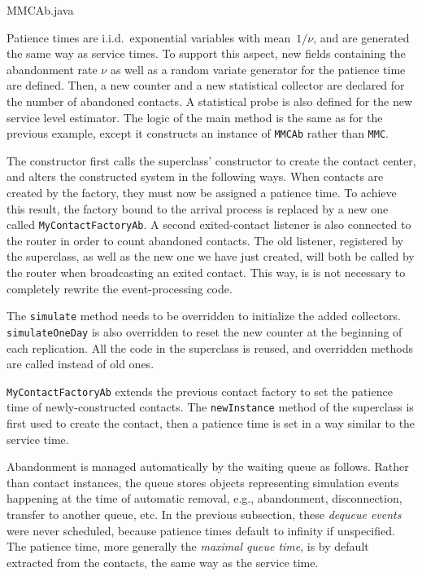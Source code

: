 
{MMCAb.java}

Patience times are i.i.d.\ exponential variables with mean~$1/\nu$,
and are generated the same way as service times.
To support this aspect,
new fields containing the abandonment rate $\nu$ as well as a random
variate generator for the patience time are defined.
Then, a new counter and a new statistical
collector are declared for the number of abandoned contacts.
A statistical probe is also defined for the new service level estimator.
The logic of the main method is the same as for the previous example,
except it constructs an instance of \texttt{MMCAb} rather than
\texttt{MMC}.

The constructor first calls the superclass' constructor to create the
contact center, and alters the constructed system in the following
ways.  When contacts are created by the factory, they
must now be assigned a patience time.  To
achieve this result, the factory bound to the arrival process is
replaced by a new one called \texttt{My\-Contact\-Factory\-Ab}.  A
second exited-contact listener is also connected to the router in order
to count abandoned contacts.  The old listener, registered by the
superclass,
as well as the new one we have just created, will both be called by
the router when broadcasting an exited contact.  This way, is is not
necessary to completely rewrite the event-processing code.

The \texttt{simulate} method needs to be overridden to initialize the
added collectors.  \texttt{simulate\-One\-Day} is also overridden to reset
the new counter at the beginning of each replication.  All the code in
the superclass is reused, and overridden methods are called instead of
old ones.

\texttt{My\-Contact\-Factory\-Ab} extends the previous contact
factory to set the patience time of newly-constructed contacts. The
\texttt{new\-Instance} method of the superclass is first used to create the
contact, then a patience time is set in a way similar to the service time.

Abandonment is managed automatically by the waiting queue as follows.
Rather than contact instances, the queue stores objects representing
simulation events
happening at the time of automatic removal, e.g., abandonment,
disconnection, transfer to another queue, etc.
In the previous subsection, these \emph{dequeue events} were never
scheduled,
because patience times default to infinity if unspecified.  The
patience time, more generally the \emph{maximal queue time}, is by
default extracted from the contacts, the same way as the service
time.


